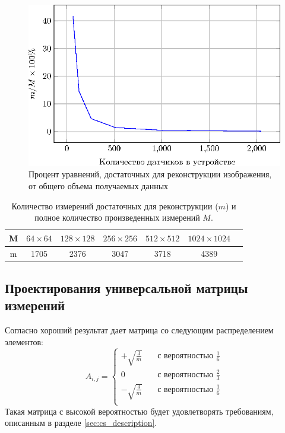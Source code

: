 \documentclass[14pt]{matmex-diploma}
\begin{document}
\begin{figure}[h]
    \centering
    \includegraphics[width=0.8\linewidth]{pics_eps/percents_estimation.eps}
    \caption{\small Процент уравнений, достаточных для реконструкции изображения, от общего объема получаемых данных}
    \label{fig:percents_est}
\end{figure}

\begin{table}[h]
\centering
\begin{tabular}{| c | c | c | c | c | c | c |}
    \hline
    M & $64\times 64$ & $128\times 128$ & $256\times 256$ & $512\times 512$ & $1024\times 1024$  \\
    \hline
    m & 1705 & 2376 & 3047 & 3718 & 4389 \\
    \hline
\end{tabular}
\caption{\small Количество измерений достаточных для реконструкции ($m$) и полное количество произведенных измерений $M$.}
\label{table:m_computed}
\end{table}

\subsection{Проектирования универсальной матрицы измерений}
Согласно \cite{baraniuk2008simple} хороший результат дает матрица со следующим распределением элементов:
\[ A_{i,j} =
  \begin{cases}
    +\sqrt{\frac{3}{m}}      & \quad \text{с вероятностью } \frac{1}{6}\\
    0   & \quad \text{с вероятностью } \frac{2}{3}\\
    -\sqrt{\frac{3}{m}}       & \quad \text{с вероятностью } \frac{1}{6}\\
  \end{cases}
\]
Такая матрица с высокой вероятностью будет удовлетворять требованиям, описанным в разделе \ref{sec:cs_description}.\\
\end{document}
